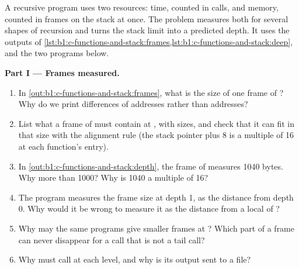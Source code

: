 \begin{problem}\label{pb:b1:c-functions-and-stack:1}
A recursive program uses two resources: time, counted in calls, and memory, counted in frames on the stack at once.
The problem measures both for several shapes of recursion and turns the stack limit into a predicted depth. It uses
the outputs of \cref{lst:b1:c-functions-and-stack:frames,lst:b1:c-functions-and-stack:deep}, and the two programs
below.
\label{lst:b1:c-functions-and-stack:shapes}
\label{out:b1:c-functions-and-stack:shapes}
\label{out:b1:c-functions-and-stack:problem}

\medskip\noindent\textbf{Part I --- Frames measured.}
\begin{enumerate}
\item In \cref{out:b1:c-functions-and-stack:frames}, what is the size of one frame of ? Why do we
print differences of addresses rather than addresses?
\item List what a frame of  must contain at , with sizes, and check that it can fit in that
size with the alignment rule (the stack pointer plus 8 is a multiple of 16 at each function's entry).
\item In \cref{out:b1:c-functions-and-stack:depth}, the frame of  measures 1040 bytes. Why more than
1000? Why is 1040 a multiple of 16?
\item The program measures the frame size at depth 1, as the distance from depth 0. Why would it be wrong to
measure it as the distance from a local of ?
\item Why may the same programs give smaller frames at ? Which part of a frame can never disappear for a
call that is not a tail call?
\item Why must  call  at each level, and why is its output sent to a file?
\end{enumerate}


\end{problem}
